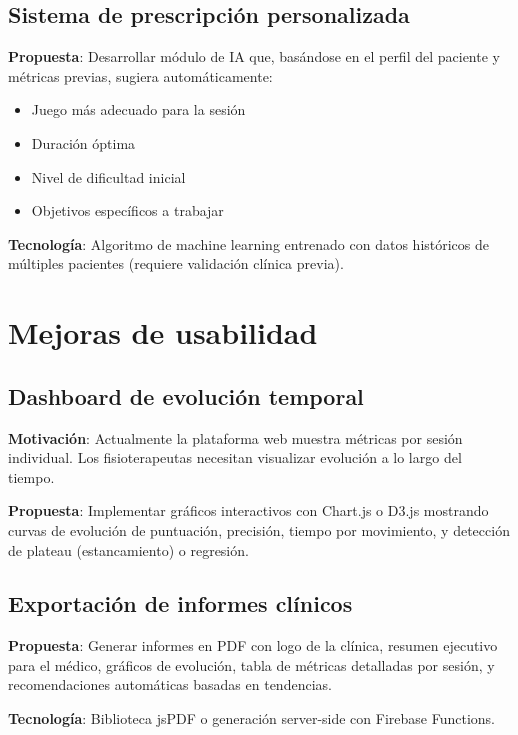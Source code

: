 \subsection{Sistema de prescripción personalizada}

\textbf{Propuesta}: Desarrollar módulo de IA que, basándose en el perfil del paciente y métricas previas, sugiera automáticamente:

\begin{itemize}
    \item Juego más adecuado para la sesión
    \item Duración óptima
    \item Nivel de dificultad inicial
    \item Objetivos específicos a trabajar
\end{itemize}

\textbf{Tecnología}: Algoritmo de machine learning entrenado con datos históricos de múltiples pacientes (requiere validación clínica previa).

\section{Mejoras de usabilidad}

\subsection{Dashboard de evolución temporal}

\textbf{Motivación}: Actualmente la plataforma web muestra métricas por sesión individual. Los fisioterapeutas necesitan visualizar evolución a lo largo del tiempo.

\textbf{Propuesta}: Implementar gráficos interactivos con Chart.js o D3.js mostrando curvas de evolución de puntuación, precisión, tiempo por movimiento, y detección de plateau (estancamiento) o regresión.

\subsection{Exportación de informes clínicos}

\textbf{Propuesta}: Generar informes en PDF con logo de la clínica, resumen ejecutivo para el médico, gráficos de evolución, tabla de métricas detalladas por sesión, y recomendaciones automáticas basadas en tendencias.

\textbf{Tecnología}: Biblioteca jsPDF o generación server-side con Firebase Functions.

